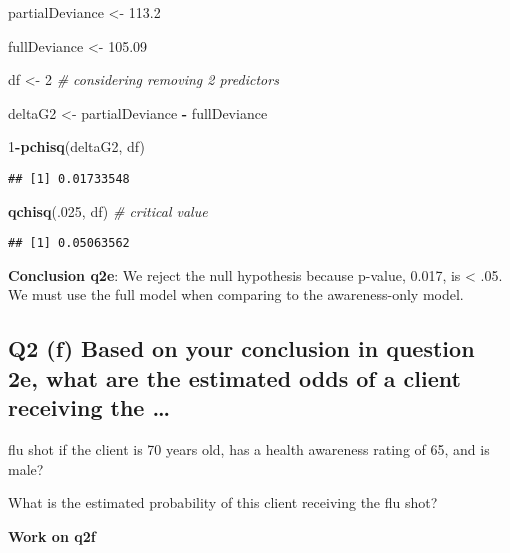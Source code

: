 \documentclass[
]{article}
\newenvironment{Shaded}{\begin{snugshade}}{\end{snugshade}}
\newcommand{\CommentTok}[1]{\textcolor[rgb]{0.56,0.35,0.01}{\textit{#1}}}
\newcommand{\DecValTok}[1]{\textcolor[rgb]{0.00,0.00,0.81}{#1}}
\newcommand{\FloatTok}[1]{\textcolor[rgb]{0.00,0.00,0.81}{#1}}
\newcommand{\KeywordTok}[1]{\textcolor[rgb]{0.13,0.29,0.53}{\textbf{#1}}}
\newcommand{\NormalTok}[1]{#1}
\newcommand{\OperatorTok}[1]{\textcolor[rgb]{0.81,0.36,0.00}{\textbf{#1}}}
\newcommand{\StringTok}[1]{\textcolor[rgb]{0.31,0.60,0.02}{#1}}
\begin{document}
\begin{Shaded}
\begin{Highlighting}[]
\NormalTok{partialDeviance <-}\StringTok{ }\FloatTok{113.2}

\NormalTok{fullDeviance <-}\StringTok{ }\FloatTok{105.09}

\NormalTok{df <-}\StringTok{ }\DecValTok{2} \CommentTok{# considering removing 2 predictors}

\NormalTok{deltaG2 <-}\StringTok{ }\NormalTok{partialDeviance }\OperatorTok{-}\StringTok{ }\NormalTok{fullDeviance}

\DecValTok{1}\OperatorTok{-}\KeywordTok{pchisq}\NormalTok{(deltaG2, df)}
\end{Highlighting}
\end{Shaded}

\begin{verbatim}
## [1] 0.01733548
\end{verbatim}

\begin{Shaded}
\begin{Highlighting}[]
\KeywordTok{qchisq}\NormalTok{(.}\DecValTok{025}\NormalTok{, df) }\CommentTok{# critical value}
\end{Highlighting}
\end{Shaded}

\begin{verbatim}
## [1] 0.05063562
\end{verbatim}

\textbf{Conclusion q2e}: We reject the null hypothesis because p-value,
0.017, is \textless{} .05. We must use the full model when comparing to
the awareness-only model.

\hypertarget{q2-f-based-on-your-conclusion-in-question-2e-what-are-the-estimated-odds-of-a-client-receiving-the}{%
\subsection{Q2 (f) Based on your conclusion in question 2e, what are the
estimated odds of a client receiving the
\ldots{}}\label{q2-f-based-on-your-conclusion-in-question-2e-what-are-the-estimated-odds-of-a-client-receiving-the}}

flu shot if the client is 70 years old, has a health awareness rating of
65, and is male?

What is the estimated probability of this client receiving the flu shot?

\textbf{Work on q2f}
\end{document}
